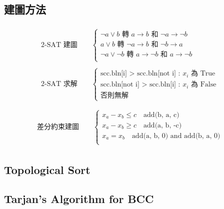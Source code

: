 \documentclass[a4paper,10pt,twocolumn,oneside]{article}
\newcommand{\inputcpp}[1]{}  %
\begin{document}
\subsection{建圖方法}
\begin{gather*}
  \begin{aligned}
    \textrm{2-SAT 建圖} \qquad
    \begin{cases}
      \neg a \vee b \textrm{ 轉 } a \to b \textrm{ 和 } \neg a \to \neg b \\
      a \vee b \textrm{ 轉 } \neg a \to b \textrm{ 和 } \neg b \to a \\
      \neg a \vee \neg b \textrm{ 轉 } a \to \neg b \textrm{ 和 } a \to \neg b \\
    \end{cases}
  \end{aligned}  \\
  \begin{aligned}
    \textrm{2-SAT 求解} \qquad
    \begin{cases}
    \textrm{scc.bln[i] > scc.bln[not i] : } x_i \textrm{ 為 True} \\
    \textrm{scc.bln[not i] > scc.bln[i] : } x_i \textrm{ 為 False} \\
    \textrm{否則無解}
    \end{cases}
  \end{aligned}   \\
\end{gather*}
\begin{gather*}
  \begin{aligned}
    \textrm{差分約束建圖} \qquad
    \begin{cases}
      x_a - x_b \le c \quad \textrm{add(b, a, c)} \\
      x_a - x_b \ge c \quad \textrm{add(a, b, -c)} \\
      x_a = x_b \quad \textrm{add(a, b, 0) and add(b, a, 0)} \\
    \end{cases}
  \end{aligned}
\end{gather*}

\subsection{Topological Sort}
\inputcpp{graph_theory/topological_sort.cpp}

\subsection{Tarjan's Algorithm for BCC}
\inputcpp{graph_theory/bcc_tarjan.cpp}
\end{document}
